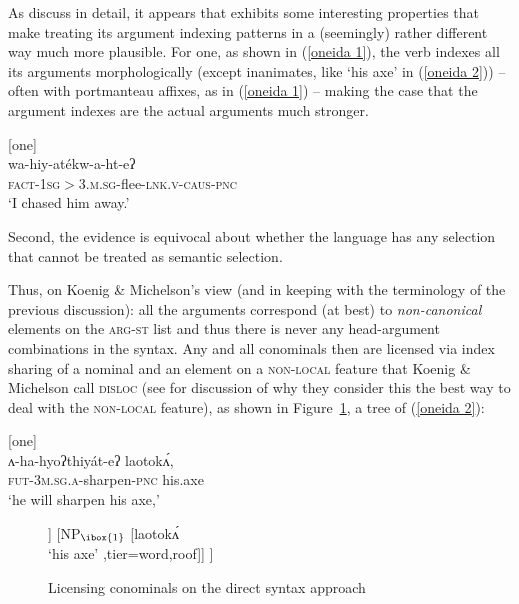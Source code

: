 \documentclass[output=paper
	        ,collection
	        ,collectionchapter
 	        ,biblatex
                ,babelshorthands
                ,newtxmath
                ,draftmode
                ,colorlinks, citecolor=brown
]{langscibook}
\begin{document}
As \citet{KM15} discuss in detail, it appears that  exhibits some interesting properties that make treating its argument indexing patterns in a (seemingly) rather different way much more plausible. For one, as shown in (\ref{oneida 1}), the verb indexes all its arguments morphologically (except inanimates, like `his axe' in (\ref{oneida 2})) -- often with portmanteau affixes, as in (\ref{oneida 1}) -- making the case that the argument indexes are the actual arguments much stronger. 
%
\begin{exe}
\ex\label{oneida 1}  [one] \citep[5]{KM15} \\
\gll wa-hiy-at\'{e}{\textperiodcentered}kw-a-ht-eʔ \\
\textsc{fact}-\textsc{1sg$>$3.m.sg}-flee-\textsc{lnk.v}-\textsc{caus}-\textsc{pnc} \\
\glt `I chased him away.' 
\end{exe} 
%
Second, the evidence is equivocal about whether the language has any selection that cannot be treated as semantic selection.

Thus, on Koenig \& Michelson's view (and in keeping with the terminology of the previous discussion): all the arguments correspond (at best) to \textit{non-canonical} elements on the \textsc{arg-st} list and thus there is never any head-argument combinations in the syntax. Any and all conominals then are licensed via index sharing of a nominal and an element on a \textsc{non-local} feature that Koenig \& Michelson call  \textsc{disloc} (see \citealt[39]{KM15} for discussion of why they consider this the best way to deal with  the \textsc{non-local} feature), as shown in Figure~\ref{nonlocal tree}, a tree of (\ref{oneida 2}):
\begin{exe}
\ex\label{oneida 2}  [one] \citep[17]{KM15} \\
\gll ʌ-ha-hyoʔthi{\textperiodcentered}y\'{a}t-eʔ laoto{\textperiodcentered}k\'{ʌ}{\textperiodcentered},\\
\textsc{fut}-\textsc{3m.sg.a}-sharpen-\textsc{pnc} his.axe \\
\glt `he will sharpen his axe,'
\end{exe} 
%
\begin{figure}[htp]
\centering
\begin{forest}
[%
\avmtmp{
	[head & verb \\
	disloc & \{ \} ]
} 
	[%
	\avmtmp{
		[head & verb \\
		disloc & \{\1\} ]
	}
		[ʌhahyoʔthi{\textperiodcentered}y\'{a}teʔ \\ `he will sharpen' , tier=word]]
	[NP$_{\ibox{1}}$ [laoto{\textperiodcentered}k\'{ʌ}{\textperiodcentered} \\ `his axe' ,tier=word,roof]]
]
\end{forest}
\caption{Licensing conominals on the direct syntax approach}
\label{nonlocal tree}
\end{figure}
 
\end{document}
